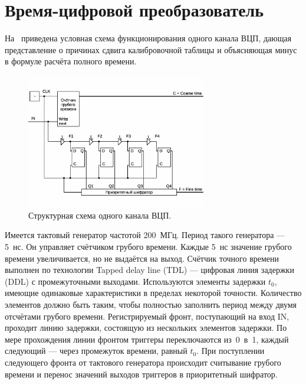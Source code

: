 \section{Время-цифровой преобразователь}\label{sec:secTDC}

На~ приведена условная схема функционирования одного канала ВЦП, дающая представление о причинах сдвига калибровочной таблицы и объясняющая минус в формуле расчёта полного времени.

\begin{figure}[H]
\centering
\includegraphics[width=0.7\textwidth]{pictures/TDC.eps}
\caption{Структурная схема одного канала ВЦП.}
\label{fig:TDCscheme}
\end{figure}

Имеется тактовый генератор частотой 200~МГц. Период такого генератора --- 5~нс. Он управляет счётчиком грубого времени. Каждые 5~нс значение грубого времени увеличивается, но не выдаётся на выход. Счётчик точного времени выполнен по технологии Tapped delay line (TDL) --- цифровая линия задержки (DDL) с промежуточными выходами. Используются элементы задержки $t_{0}$, имеющие одинаковые характеристики в пределах некоторой точности. Количество элементов должно быть таким, чтобы полностью заполнить период между двумя отсчётами грубого времени. Регистрируемый фронт, поступающий на вход IN, проходит линию задержки, состоящую из нескольких элементов задержки. По мере прохождения линии фронтом триггеры переключаются из~0~в~1, каждый следующий --- через промежуток времени, равный $t_{0}$. При поступлении следующего фронта от тактового генератора происходит считывание грубого времени и перенос значений выходов триггеров в приоритетный шифратор.


